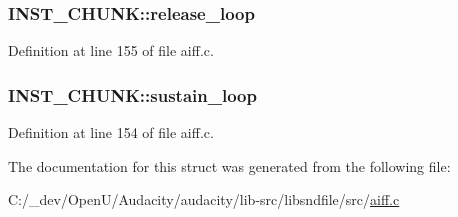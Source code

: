 \subsubsection[{\texorpdfstring{release\+\_\+loop}{release_loop}}]{ I\+N\+S\+T\+\_\+\+C\+H\+U\+N\+K\+::release\+\_\+loop}\hypertarget{struct_i_n_s_t___c_h_u_n_k_a8b04f9d206ac94748f16000795a33b4c}{}\label{struct_i_n_s_t___c_h_u_n_k_a8b04f9d206ac94748f16000795a33b4c}


Definition at line 155 of file aiff.\+c.

\subsubsection[{\texorpdfstring{sustain\+\_\+loop}{sustain_loop}}]{ I\+N\+S\+T\+\_\+\+C\+H\+U\+N\+K\+::sustain\+\_\+loop}\hypertarget{struct_i_n_s_t___c_h_u_n_k_a40f8a09a1dfe4962e70a3099030b11a9}{}\label{struct_i_n_s_t___c_h_u_n_k_a40f8a09a1dfe4962e70a3099030b11a9}


Definition at line 154 of file aiff.\+c.



The documentation for this struct was generated from the following file\+:\begin{DoxyCompactItemize}
\item 
C\+:/\+\_\+dev/\+Open\+U/\+Audacity/audacity/lib-\/src/libsndfile/src/\hyperlink{aiff_8c}{aiff.\+c}\end{DoxyCompactItemize}
